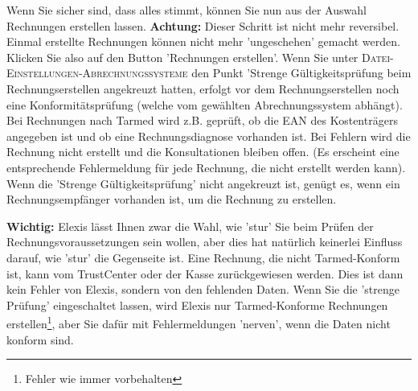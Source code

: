\documentclass[a4paper]{scrartcl}
\begin{document}
Wenn Sie sicher sind, dass alles stimmt, können Sie nun aus der Auswahl Rechnungen erstellen lassen. \textbf{Achtung:} Dieser Schritt ist nicht mehr reversibel. Einmal erstellte Rechnungen können nicht mehr 'ungeschehen' gemacht werden. Klicken Sie also auf den Button 'Rechnungen erstellen'.
Wenn Sie unter \textsc{Datei-Einstellungen-Abrechnungssysteme} den Punkt 'Strenge Gültigkeitsprüfung beim Rechnungserstellen  angekreuzt hatten, erfolgt vor dem Rechnungserstellen noch eine Konformitätsprüfung (welche  vom gewählten Abrechnungssystem abhängt). Bei Rechnungen nach Tarmed wird z.B. geprüft, ob die EAN des Kostenträgers angegeben ist und ob eine Rechnungsdiagnose vorhanden ist. Bei Fehlern wird die Rechnung nicht erstellt und die Konsultationen bleiben offen. (Es erscheint eine entsprechende Fehlermeldung für jede Rechnung, die nicht erstellt werden kann).
Wenn die 'Strenge Gültigkeitsprüfung' nicht angekreuzt ist, genügt es, wenn ein Rechnungsempfänger vorhanden ist, um die Rechnung zu erstellen.

\medskip

\textbf{Wichtig:} Elexis lässt Ihnen zwar die Wahl, wie 'stur' Sie beim Prüfen der Rechnungsvoraussetzungen sein wollen, aber dies hat natürlich keinerlei Einfluss darauf, wie 'stur' die Gegenseite ist. Eine Rechnung, die nicht Tarmed-Konform ist, kann vom TrustCenter oder der Kasse zurückgewiesen werden. Dies ist dann kein Fehler von Elexis, sondern von den fehlenden Daten. Wenn Sie die 'strenge Prüfung' eingeschaltet lassen, wird Elexis nur Tarmed-Konforme Rechnungen erstellen\footnote{Fehler wie immer vorbehalten}, aber Sie dafür mit Fehlermeldungen 'nerven', wenn die Daten nicht konform sind.
\end{document}
